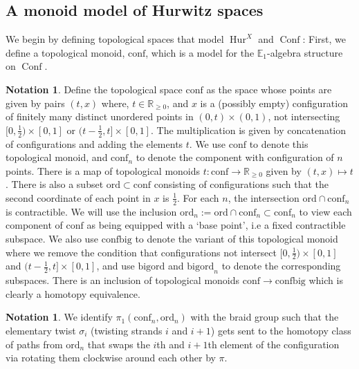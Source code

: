 \documentclass[12 pt]{amsart}
\theoremstyle{plain}
\theoremstyle{definition}
\newtheorem{notation}[theorem]{Notation}
\theoremstyle{remark}
\numberwithin{equation}{section}
\DeclareMathOperator\Hur{Hur}
\DeclareMathOperator\Conf{Conf}
\newcommand\RR{\mathbb{R}}
\newcommand\EE{\mathbb{E}}
\begin{document}
\subsection{A monoid model of Hurwitz spaces}


We begin by defining topological spaces that model $\Hur^{X}$ and $\Conf$:
First, we define a topological monoid, $\mathrm{conf}$, which is a model for the
$\EE_1$-algebra structure on $\Conf$.



\begin{notation}\label{definition:conftop}
	Define the topological space $\mathrm{conf}$
	as the space whose points are given by pairs $(t,x)$ where, $t \in
	\mathbb R_{\geq0}$, and $x$ is a (possibly empty) configuration of finitely many distinct unordered
	points in 
	$(0,t)\times (0,1)$, not intersecting $[0,\frac 1 2) \times [0,1]$ or
	$(t-\frac 1 2,t]\times [0,1]$. The multiplication is given by
	concatenation of configurations and adding the elements $t$. We use
	$\mathrm{conf}$ to denote this topological monoid, and $\mathrm{conf}_n$ to denote the component with configuration of $n$ points. There is a map of
	topological monoids $t:\mathrm{conf} \to \RR_{\geq0}$ given by $(t,x)
	\mapsto t$. There is also a subset $\mathrm{ord} \subset \mathrm{conf}$
	consisting of configurations such that the second coordinate of each
	point in $x$ is $\frac 1 2$. 	
	For each $n$, the intersection
	$\mathrm{ord} \cap \mathrm{conf}_n$ is contractible. We will use the
	inclusion $\mathrm{ord}_n :=\mathrm{ord}\cap \mathrm{conf}_n\subset \mathrm{conf}_n$ to view each component of $\mathrm{conf}$ as being equipped with a `base point', i.e a fixed contractible subspace. We also use $\mathrm{confbig}$ to denote the variant of this topological monoid where we remove the condition that configurations not intersect $[0,\frac 1 2)\times [0,1]$ and $(t-\frac 1 2,t]\times [0,1]$, and use $\mathrm{bigord}$ and $\mathrm{bigord}_n$ to denote the corresponding subspaces. 
	There is an inclusion of topological monoids $\mathrm{conf}\to \mathrm{confbig}$ which is clearly a homotopy equivalence.
\end{notation}

\begin{notation}\label{notation:braidgroup}
	We identify $\pi_1(\mathrm{conf}_n,\mathrm{ord}_n)$ with the braid group
	such that the elementary twist $\sigma_{i}$ (twisting strands $i$ and
	$i+1$) 
	gets sent to the homotopy class of paths from $\mathrm{ord}_n$ that swaps the $i$th and $i+1$th element of the configuration via rotating them clockwise around each other by $\pi$.
\end{notation}
\end{document}
